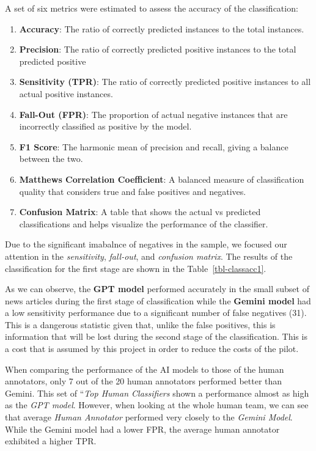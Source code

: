 \documentclass[
]{agujournal2019}
\providecommand{\tightlist}{%
  \setlength{\itemsep}{0pt}\setlength{\parskip}{0pt}}\usepackage{longtable,booktabs,array}
\begin{document}
A set of six metrics were estimated to assess the accuracy of the
classification:

\begin{enumerate}
\def\labelenumi{\arabic{enumi}.}
\tightlist
\item
  \textbf{Accuracy}: The ratio of correctly predicted instances to the
  total instances.
\item
  \textbf{Precision}: The ratio of correctly predicted positive
  instances to the total predicted positive
\item
  \textbf{Sensitivity (TPR)}: The ratio of correctly predicted positive
  instances to all actual positive instances.
\item
  \textbf{Fall-Out (FPR)}: The proportion of actual negative instances
  that are incorrectly classified as positive by the model.
\item
  \textbf{F1 Score}: The harmonic mean of precision and recall, giving a
  balance between the two.
\item
  \textbf{Matthews Correlation Coefficient}: A balanced measure of
  classification quality that considers true and false positives and
  negatives.
\item
  \textbf{Confusion Matrix}: A table that shows the actual vs predicted
  classifications and helps visualize the performance of the classifier.
\end{enumerate}

Due to the significant imabalnce of negatives in the sample, we focused
our attention in the \emph{sensitivity}, \emph{fall-out}, and
\emph{confusion matrix}. The results of the classification for the first
stage are shown in the Table~\ref{tbl-classacc1}.

As we can observe, the \textbf{GPT model} performed accurately in the
small subset of news articles during the first stage of classification
while the \textbf{Gemini model} had a low sensitivity performance due to
a significant number of false negatives (31). This is a dangerous
statistic given that, unlike the false positives, this is information
that will be lost during the second stage of the classification. This is
a cost that is assumed by this project in order to reduce the costs of
the pilot.

When comparing the performance of the AI models to those of the human
annotators, only 7 out of the 20 human annotators performed better than
Gemini. This set of ``\emph{Top Human Classifiers} shown a performance
almost as high as the \emph{GPT model}. However, when looking at the
whole human team, we can see that average \emph{Human Annotator}
performed very closely to the \emph{Gemini Model}. While the Gemini
model had a lower FPR, the average human annotator exhibited a higher
TPR.
\end{document}
